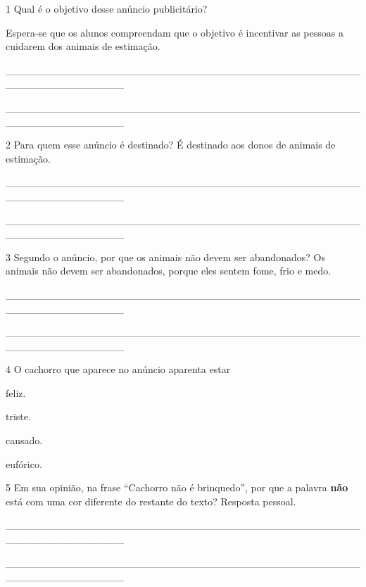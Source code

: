 \begin{boxlist}
{\num{1} Qual é o objetivo desse anúncio publicitário?

Espera-se que os alunos compreendam que o objetivo é incentivar as
pessoas a cuidarem dos animais de estimação.

\_\_\_\_\_\_\_\_\_\_\_\_\_\_\_\_\_\_\_\_\_\_\_\_\_\_\_\_\_\_\_\_\_\_\_\_\_\_\_\_\_\_\_\_\_\_\_\_\_\_\_\_\_\_\_\_\_\_\_\_\_\_\_\_

\_\_\_\_\_\_\_\_\_\_\_\_\_\_\_\_\_\_\_\_\_\_\_\_\_\_\_\_\_\_\_\_\_\_\_\_\_\_\_\_\_\_\_\_\_\_\_\_\_\_\_\_\_\_\_\_\_\_\_\_\_\_\_\_

\num{2} Para quem esse anúncio é destinado? É destinado aos donos de animais
de estimação.

\_\_\_\_\_\_\_\_\_\_\_\_\_\_\_\_\_\_\_\_\_\_\_\_\_\_\_\_\_\_\_\_\_\_\_\_\_\_\_\_\_\_\_\_\_\_\_\_\_\_\_\_\_\_\_\_\_\_\_\_\_\_\_\_

\_\_\_\_\_\_\_\_\_\_\_\_\_\_\_\_\_\_\_\_\_\_\_\_\_\_\_\_\_\_\_\_\_\_\_\_\_\_\_\_\_\_\_\_\_\_\_\_\_\_\_\_\_\_\_\_\_\_\_\_\_\_\_\_

\num{3} Segundo o anúncio, por que os animais não devem ser abandonados? Os animais não devem ser abandonados, porque eles sentem fome, frio e medo.

\_\_\_\_\_\_\_\_\_\_\_\_\_\_\_\_\_\_\_\_\_\_\_\_\_\_\_\_\_\_\_\_\_\_\_\_\_\_\_\_\_\_\_\_\_\_\_\_\_\_\_\_\_\_\_\_\_\_\_\_\_\_\_\_

\_\_\_\_\_\_\_\_\_\_\_\_\_\_\_\_\_\_\_\_\_\_\_\_\_\_\_\_\_\_\_\_\_\_\_\_\_\_\_\_\_\_\_\_\_\_\_\_\_\_\_\_\_\_\_\_\_\_\_\_\_\_\_\_

\num{4} O cachorro que aparece no anúncio aparenta estar

\begin{escolha}
  \item feliz.
  \item triste.
  \item cansado.
  \item eufórico.
\end{escolha}


\num{5} Em sua opinião, na frase ``Cachorro não é brinquedo'', por que a
palavra \textbf{não} está com uma cor diferente do restante do texto?
Resposta pessoal.

\_\_\_\_\_\_\_\_\_\_\_\_\_\_\_\_\_\_\_\_\_\_\_\_\_\_\_\_\_\_\_\_\_\_\_\_\_\_\_\_\_\_\_\_\_\_\_\_\_\_\_\_\_\_\_\_\_\_\_\_\_\_\_\_

\_\_\_\_\_\_\_\_\_\_\_\_\_\_\_\_\_\_\_\_\_\_\_\_\_\_\_\_\_\_\_\_\_\_\_\_\_\_\_\_\_\_\_\_\_\_\_\_\_\_\_\_\_\_\_\_\_\_\_\_\_\_\_\_

}
\end{boxlist}
